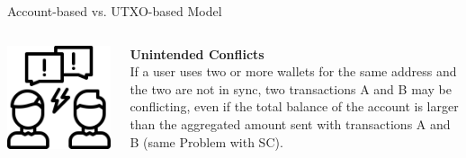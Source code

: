 \documentclass[handout]{beamer}
\begin{document}
\begin{frame}{Account-based vs. UTXO-based Model}
{\begin{columns}[T]
\begin{column}{0.25\textwidth}
			\includegraphics[scale=0.1]{../assets/images/argument.png}
		\end{column}
		\begin{column}{0.8\textwidth}
			\textbf{Unintended Conflicts}\\
If a user uses two or more wallets for the same address and the two are not in sync, two transactions A and B may be conflicting, even if the total balance of the account is larger than the aggregated amount sent with transactions A and B (same Problem with SC).
		\end{column}
	\end{columns}
		}
\end{frame}
\end{document}
